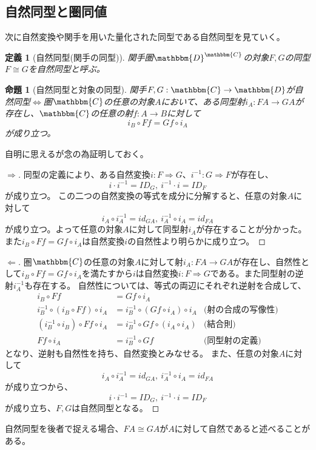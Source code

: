 \documentclass[uplatex,dvipdfmx]{jsarticle}
\newcommand{\cat}[1]{\mathbbm{#1}}
\newcommand{\arrow}{\rightarrow}
\newcommand{\functor}[3]{#1:\cat{#2}\arrow \cat{#3}}
\newcommand{\nat}[3]{#1:#2\Rightarrow #3}
\newcommand{\mor}[3]{#1:#2\arrow #3}
\newcommand{\funccat}[2]{\cat{#2}^\cat{#1}}
\newtheorem{proof}{証明}[section]
\newtheorem{prop}{命題}[section]
\newtheorem{define}{定義}[section]
\numberwithin{proof}{subsection}
\numberwithin{prop}{subsection}
\numberwithin{define}{subsection}
\begin{document}
	\subsection{自然同型と圏同値}
  次に自然変換や関手を用いた量化された同型である自然同型を見ていく。
  \begin{define}[自然同型(関手の同型)]
    関手圏$\funccat{C}{D}$の対象$F,G$の同型$F\cong G$を自然同型と呼ぶ。
  \end{define}
  \begin{prop}[自然同型と対象の同型]
    関手$\functor{F,G}{C}{D}$が自然同型$\iff$圏$\cat{C}$の任意の対象$A$において、ある同型射$\mor{i_A}{FA}{GA}$が存在し、$\cat{C}$の任意の射$\mor{f}{A}{B}$に対して\[i_B\circ Ff=Gf\circ i_A\]が成り立つ。
  \end{prop}
  自明に思えるが念の為証明しておく。
  \begin{proof}[$\Longrightarrow$]
    同型の定義により、ある自然変換$\nat{i}{F}{G}$、$\nat{i^{-1}}{G}{F}$が存在し、\[i\cdot i^{-1}=ID_G,\ i^{-1}\cdot i=ID_F\]が成り立つ。
    この二つの自然変換の等式を成分に分解すると、任意の対象$A$に対して\[i_A\circ i^{-1}_A=id_{GA},\ i^{-1}_A\circ i_A=id_{FA}\]が成り立つ。よって任意の対象$A$に対して同型射$i_A$が存在することが分かった。
    また$i_B\circ Ff=Gf\circ i_A$は自然変換$i$の自然性より明らかに成り立つ。
  \end{proof}
  \begin{proof}[$\Longleftarrow$]
    圏$\cat{C}$の任意の対象$A$に対して射$\mor{i_A}{FA}{GA}$が存在し、自然性として$i_B\circ Ff=Gf\circ i_A$を満たすから$i$は自然変換$\nat{i}{F}{G}$である。また同型射の逆射$i^{-1}_A$も存在する。
    自然性については、等式の両辺にそれぞれ逆射を合成して、
    \begin{align*}
      i_B\circ Ff &=Gf\circ i_A\\
      i^{-1}_B\circ (i_B\circ Ff)\circ i_A &=i^{-1}_B\circ(Gf\circ i_A)\circ i_A&\text{(射の合成の写像性)}\\
      (i^{-1}_B\circ i_B)\circ Ff\circ i_A &=i^{-1}_B\circ Gf\circ (i_A\circ i_A)&\text{(結合則)}\\
      Ff\circ i_A&=i^{-1}_B\circ Gf&\text{(同型射の定義)}
    \end{align*}
    となり、逆射も自然性を持ち、自然変換とみなせる。
    また、任意の対象$A$に対して\[i_A\circ i^{-1}_A=id_{GA},\ i^{-1}_A\circ i_A=id_{FA}\]が成り立つから、\[i\cdot i^{-1}=ID_G,\ i^{-1}\cdot i=ID_F\]が成り立ち、$F,G$は自然同型となる。
  \end{proof}
  自然同型を後者で捉える場合、$FA\cong GA$が$A$に対して自然であると述べることがある。
\end{document}
